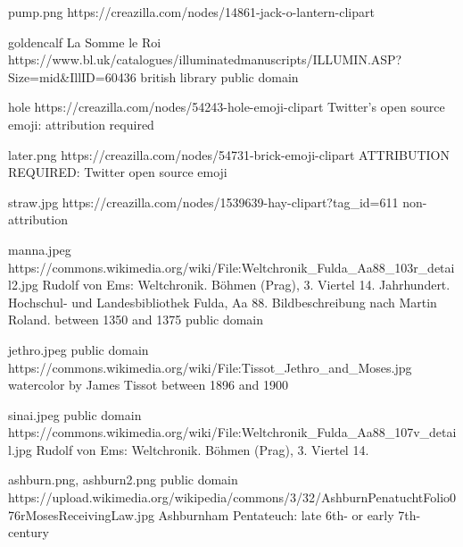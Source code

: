 pump.png
https://creazilla.com/nodes/14861-jack-o-lantern-clipart

goldencalf
La Somme le Roi
https://www.bl.uk/catalogues/illuminatedmanuscripts/ILLUMIN.ASP?Size=mid&IllID=60436
british library public domain 

hole
https://creazilla.com/nodes/54243-hole-emoji-clipart
Twitter’s open source emoji: attribution required

later.png
https://creazilla.com/nodes/54731-brick-emoji-clipart
ATTRIBUTION REQUIRED: Twitter open source emoji

straw.jpg
https://creazilla.com/nodes/1539639-hay-clipart?tag_id=611
non-attribution

manna.jpeg
https://commons.wikimedia.org/wiki/File:Weltchronik_Fulda_Aa88_103r_detail2.jpg
Rudolf von Ems: Weltchronik. Böhmen (Prag), 3. Viertel 14. Jahrhundert. Hochschul- und Landesbibliothek Fulda, Aa 88. Bildbeschreibung nach Martin Roland.
between 1350 and 1375 
public domain

jethro.jpeg
public domain
https://commons.wikimedia.org/wiki/File:Tissot_Jethro_and_Moses.jpg
watercolor by James Tissot
between 1896 and 1900 

sinai.jpeg
public domain
https://commons.wikimedia.org/wiki/File:Weltchronik_Fulda_Aa88_107v_detail.jpg
Rudolf von Ems: Weltchronik. Böhmen (Prag), 3. Viertel 14.

ashburn.png, ashburn2.png
public domain
https://upload.wikimedia.org/wikipedia/commons/3/32/AshburnPenatuchtFolio076rMosesReceivingLaw.jpg
Ashburnham Pentateuch: late 6th- or early 7th-century

